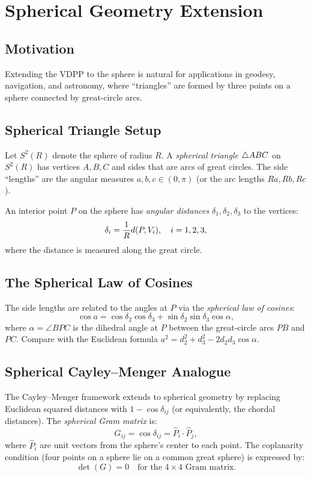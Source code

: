 \chapter{Spherical Geometry Extension}
\label{ch:spherical}

\section{Motivation}
Extending the VDPP to the sphere is natural for applications in geodesy, navigation, and astronomy, where ``triangles'' are formed by three points on a sphere connected by great-circle arcs.

\section{Spherical Triangle Setup}
Let $S^2(R)$ denote the sphere of radius $R$. A \emph{spherical triangle} $\triangle ABC$ on $S^2(R)$ has vertices $A, B, C$ and sides that are arcs of great circles. The side ``lengths'' are the angular measures $a, b, c \in (0, \pi)$ (or the arc lengths $Ra, Rb, Rc$).

An interior point $P$ on the sphere has \emph{angular distances} $\delta_1, \delta_2, \delta_3$ to the vertices:
\begin{equation}
\delta_i = \frac{1}{R}d(P, V_i), \quad i = 1, 2, 3,
\end{equation}
where the distance is measured along the great circle.

\section{The Spherical Law of Cosines}
The side lengths are related to the angles at $P$ via the \emph{spherical law of cosines}:
\begin{equation}
\cos a = \cos\delta_2 \cos\delta_3 + \sin\delta_2 \sin\delta_3 \cos\alpha,
\end{equation}
where $\alpha = \angle BPC$ is the dihedral angle at $P$ between the great-circle arcs $PB$ and $PC$. Compare with the Euclidean formula $a^2 = d_2^2 + d_3^2 - 2d_2 d_3\cos\alpha$.

\section{Spherical Cayley--Menger Analogue}
The Cayley--Menger framework extends to spherical geometry by replacing Euclidean squared distances with $1 - \cos\delta_{ij}$ (or equivalently, the chordal distances). The \emph{spherical Gram matrix} is:
\begin{equation}
G_{ij} = \cos\delta_{ij} = \hat{P}_i \cdot \hat{P}_j,
\end{equation}
where $\hat{P}_i$ are unit vectors from the sphere's center to each point. The coplanarity condition (four points on a sphere lie on a common great sphere) is expressed by:
\begin{equation}
\det(G) = 0 \quad \text{for the } 4 \times 4 \text{ Gram matrix}.
\end{equation}

